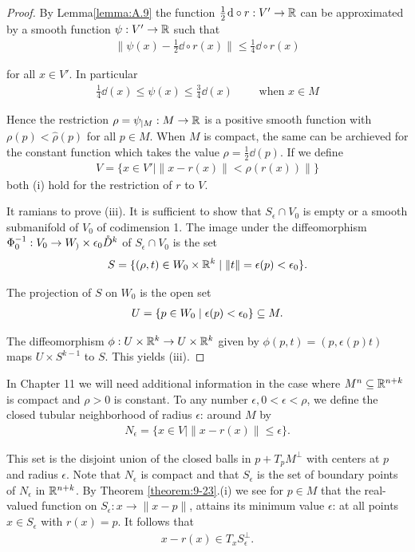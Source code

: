 \begin{proof}
By Lemma\ref{lemma:A.9} the function $\frac12\dd\circ r: V'\to \RR$ can be approximated by a smooth 
function $\psi:V'\to {\ensuremath{\mathbb{R}}}$ such that 
\begin{align*}
  \|\psi(x) - \frac12\dd\circ r(x)\| \le \frac14\dd\circ r(x)
\end{align*}

for all $x\in V'$. In particular
\begin{align*}
  \frac{1}{4}\dd(x)\le \psi(x)\le \frac34\dd(x)\qquad \text{ when } x\in M
\end{align*}

Hence the restriction $\rho = \psi_{|M}:M\to{\ensuremath{\mathbb{R}}}$ is a positive smooth function with 
$\rho(p)<\hat{\rho}(p)$ for all $p\in M$. When $M$ is compact, the same can be archieved 
for the constant function which takes the value $\rho =\frac12\dd(p)$. If we define 
\begin{align*}
  V = \{x\in V'\mid \|x-r(x)\|<\rho(r(x))\|\}
\end{align*}
both (i) hold for the restriction of $r$ to $V$.

It ramians to prove (iii). It is sufficient to show that $S_\epsilon\cap V_0$ is empty 
or a smooth submanifold of $V_0$ of codimension 1. The image under the diffeomorphism 
$\Phi_0^{-1}:V_0\to W_)\times \epsilon_0\mathring{D}^k$ of $S_\epsilon\cap V_0$ is the set 
\begin{align*}
  S = \{(\rho, t)\in W_0\times {\ensuremath{\mathbb{R}}}^k \mid \|t\|=\epsilon(p)<\epsilon_0\}.
\end{align*}

The projection of $S$ on $W_0$ is the open set 
\begin{align*}
  U = \{p\in W_0\mid \epsilon(p)<\epsilon_0\}\subseteq M.
\end{align*}

The diffeomorphism $\phi:U\times{\ensuremath{\mathbb{R}}}^k\to U\times{\ensuremath{\mathbb{R}}}^k$ given by $\phi(p, t) = (p, \epsilon(p)t)$
maps $U\times S^{k-1}$ to $S$. This yields (iii).
\end{proof}

\begin{remark}\label{remark:9-24}
  In Chapter 11 we will need additional information in the case where
$M^n\subseteq{\ensuremath{\mathbb{R}}}^{n+k}$ is compact and $\rho>0$ is constant. To any number $\epsilon, 0<\epsilon<\rho$, 
we define the closed tubular neighborhood of radius $\epsilon$: around $M$ by
\begin{align*}
  N_\epsilon = \{x\in V\mid \|x-r(x)\|\le \epsilon\}.
\end{align*}

This set is the disjoint union of the closed balls in $p+T_pM^\perp$ with centers at $p$ and
radius $\epsilon$. Note that $N_\epsilon$ is compact and that $S_\epsilon$ is the set of boundary 
points of $N_\epsilon$ in ${\mathbb{R}}^{n+k}$. By Theorem \ref{theorem:9-23}.(i) we see for $p\in M$ that 
the real-valued function on $S_\epsilon:x\to\|x-p\|$, attains its minimum value $\epsilon$: at all 
points $x\in S_\epsilon$ with $r(x) = p$. It follows that
\begin{align}\label{eq:9-21}
  x -r(x)\in T_xS_\epsilon^\perp.
\end{align}
\end{remark}


